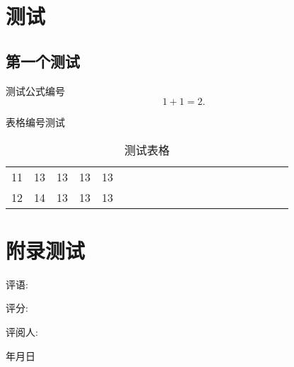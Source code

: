 \documentclass[forprint]{WHUBachelor}
\begin{document}


\cleardoublepage{}







\appendix

\chapter{测试}

\section{第一个测试}
测试公式编号
\begin{equation}
1+1=2.
\end{equation}

表格编号测试

\begin{table}[h]
  \centering
  \caption{测试表格}
  \begin{tabular}{*{20}c}
     \hline
     11 & 13  & 13  & 13  & 13 \\
     12 & 14  & 13  & 13  & 13 \\
     \hline
   \end{tabular}
\end{table}


\chapter{附录测试}

\begin{teacher}
\thispagestyle{empty}
评语: 
\par
\vspace*{12.5cm}
\hspace*{7.5cm}评分: 
\vspace*{1cm}

\hspace*{7.3cm}评阅人:

\vspace*{0.5cm}

\hspace*{10.1cm}年\hspace*{1cm}月\hspace*{1cm}日

\vspace*{0.5cm}

{\songti {} }

\end{teacher}


\cleardoublepage
\end{document}
